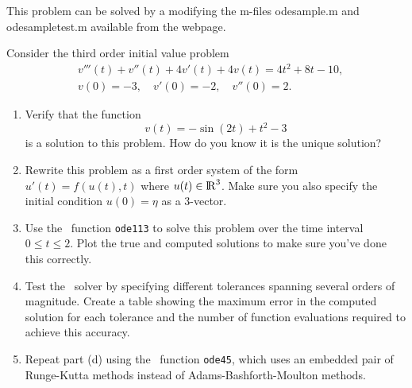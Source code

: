 

This problem can be solved by a modifying the m-files odesample.m and
odesampletest.m available from the webpage.

Consider the third order initial value problem
\begin{equation*}
\begin{split}
&v'''(t) + v''(t) + 4v'(t) + 4v(t) = 4t^2 + 8t - 10,\\
&v(0) = -3,\quad v'(0) = -2,\quad v''(0) = 2.
\end{split}
\end{equation*}

\begin{enumerate}
\item Verify that the function
\[
v(t) = -\sin(2t) + t^2 - 3
\]
is a solution to this problem.  How do you know it is the unique solution?

\item Rewrite this problem as a first order system of the form $u'(t) =
f(u(t), t)$ where $u(t) \in {{\rm l} \kern -.15em {\rm R} }^3$.  Make sure you also specify the
initial condition $u(0) = \eta$ as a 3-vector.

\item Use the \matlab\ function {\tt ode113} to solve this problem over the
time interval $0\leq t \leq 2$.  Plot the true and computed solutions to
make sure you've done this correctly.  

\item Test the \matlab\ solver by specifying different tolerances spanning
several orders of magnitude.  Create a table showing the maximum error in
the computed solution for each tolerance and the number of function
evaluations required to achieve this accuracy.

\item Repeat part (d) using the \matlab\ function {\tt ode45}, which uses
an embedded pair of Runge-Kutta methods instead of Adams-Bashforth-Moulton
methods.

\end{enumerate}


